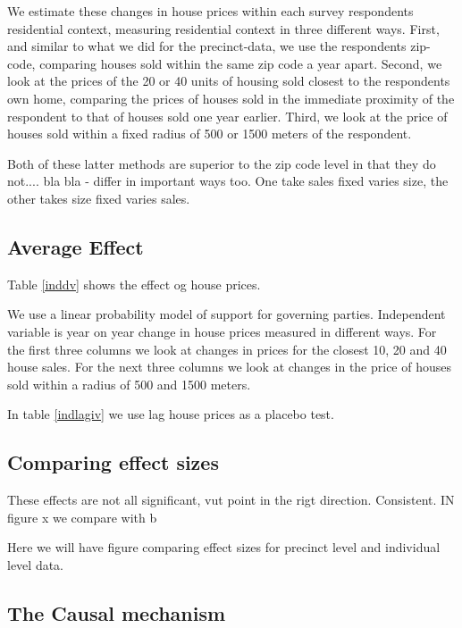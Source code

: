 \documentclass[12pt,a4paper]{article}
\begin{document}
We estimate these changes in house prices within each survey respondents residential context, measuring residential context  in three different ways. First, and similar to what we did for the precinct-data, we use the respondents zip-code, comparing houses sold within the same zip code a year apart. Second, we look at the prices of the 20 or 40 units of housing sold closest to the respondents own home, comparing the prices of houses sold in the immediate proximity of the respondent to that of houses sold one year earlier. Third, we look at the price of houses sold within a fixed radius of 500 or 1500 meters of the respondent. 

Both of these latter methods are superior to the zip code level in that they do not.... bla bla - differ in important ways too. One take sales fixed varies size, the other takes size fixed varies sales.

  

\subsection{Average Effect}


Table \ref{inddv} shows the effect og house prices.

We use a linear probability model of support for governing parties. Independent variable is year on year change in house prices measured in different ways. For the first three columns we look at changes in prices for the closest 10, 20 and 40 house sales. For the next three columns we look at changes in the price of houses sold within a radius of 500 and 1500 meters.

In table \ref{indlagiv} we use lag house prices as a placebo test.






\subsection{Comparing effect sizes}
These effects are not all significant, vut point in the rigt direction. Consistent. IN figure x we compare with b

Here we will have figure comparing effect sizes for precinct level and individual level data. 

\subsection{The Causal mechanism}
\end{document}
